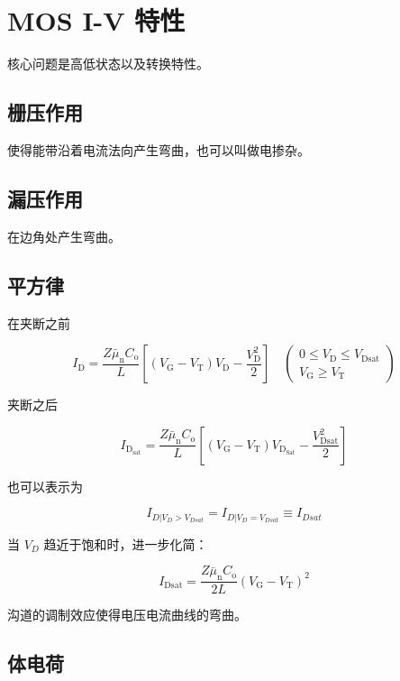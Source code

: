 \documentclass[cn,11pt,chinese,black,simple]{../elegantbook}
\begin{document}
\fi 
\def\chapname{05mosiv}

\chapter{MOS I-V 特性}

核心问题是高低状态以及转换特性。

\section{栅压作用}

使得能带沿着电流法向产生弯曲，也可以叫做电掺杂。

\section{漏压作用}

在边角处产生弯曲。 

\section{平方律}

在夹断之前

\[I_{\mathrm{D}}=\frac{Z \bar{\mu}_{\mathrm{n}} C_{\mathrm{o}}}{L}\left[\left(V_{\mathrm{G}}-V_{\mathrm{T}}\right) V_{\mathrm{D}}-\frac{V_{\mathrm{D}}^{2}}{2}\right] \quad\left(\begin{array}{l}
    0 \leqslant V_{\mathrm{D}} \leqslant V_{\mathrm{Dsat}} \\
    V_{\mathrm{G}} \geqslant V_{\mathrm{T}}
\end{array}\right)\]

夹断之后

\[I_{\mathrm{D}_{\mathrm{sat}}}=\frac{Z \bar{\mu}_{\mathrm{n}} C_{\mathrm{o}}}{L}\left[\left(V_{\mathrm{G}}-V_{\mathrm{T}}\right) V_{\mathrm{D}_{\mathrm{Sat}}}-\frac{V_{\mathrm{Dsat}}^{2}}{2}\right]\]

也可以表示为 

\[I_{D|V_D > V_{Dsat}} = I_{D|V_D=V_{Dsat}} \equiv I_{Dsat}\]

当 \(V_D\) 趋近于饱和时，进一步化简：

\[I_{\mathrm{Dsat}}=\frac{Z \bar{\mu}_{\mathrm{n}} C_{\mathrm{o}}}{2 L}\left(V_{\mathrm{G}}-V_{\mathrm{T}}\right)^{2}\]

沟道的调制效应使得电压电流曲线的弯曲。

\section{体电荷}
\end{document}
